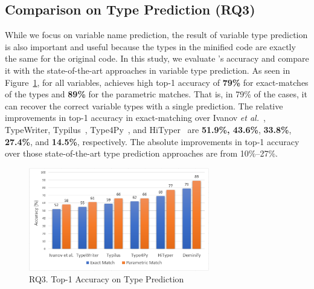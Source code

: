 \subsection{{\bf Comparison on Type Prediction (RQ3)}}
\label{empirical-rq2}




While we focus on variable name prediction, the result of variable
type prediction is also important and useful because the types in the
minified code are exactly the same for the original code.  In this
study, we evaluate {\tool}'s accuracy and compare it with the
state-of-the-art approaches in variable type prediction. As seen in
Figure~\ref{type-prediction-result}, for all variables, {\tool}
achieves high top-1 accuracy of {\bf 79\%} for exact-matches of the
types and {\bf 89\%} for the parametric matches. That is, in 79\% of
the cases, it can recover the correct variable types with a single
prediction.
%
The relative improvements in top-1 accuracy in exact-matching over
Ivanov {\em et al.}~\cite{ivanov21predicting}, TypeWriter\cite{typewriter-fse20},
Typilus~\cite{typilus-pldi20}, 
Type4Py~\cite{Type4Py-icse22}, and HiTyper~\cite{HiTyper-icse22} are
{\bf 51.9\%, 43.6\%}, {\bf 33.8\%}, {\bf 27.4\%}, and {\bf
  14.5\%}, respectively. The absolute improvements in top-1 accuracy
over those state-of-the-art type prediction approaches are from
10\%--27\%.

\begin{figure}[t]%
\begin{center}
\includegraphics[width=3.1in]{figures/type-prediction-result-2}
\vspace{-8pt}
\caption{RQ3. Top-1 Accuracy on Type Prediction}
\label{type-prediction-result}
\end{center}
\end{figure}

